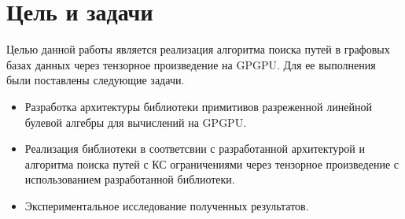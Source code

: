 \section{Цель и задачи}

Целью данной работы является реализация алгоритма поиска путей в графовых базах данных через тензорное произведение на GPGPU. Для ее выполнения были поставлены следующие задачи.

\begin{itemize}
    \item Разработка архитектуры библиотеки примитивов разреженной линейной булевой алгебры для вычислений на GPGPU.
    \item Реализация библиотеки в соответсвии с разработанной архитектурой и алгоритма поиска путей с КС ограничениями через тензорное произведение с использованием разработанной библиотеки.
    \item Экспериментальное исследование полученных результатов.
\end{itemize}